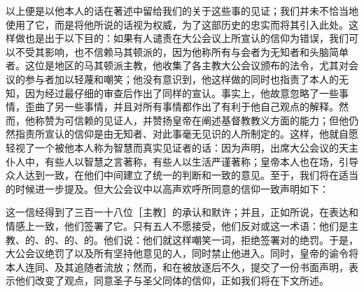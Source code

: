 以上便是以他本人的话在著述中留给我们的关于这些事的见证；我们并未不恰当地使用了它，而是将他所说的话视为权威，为了这部历史的忠实而将其引入此处。这样做也是出于以下目的：如果有人谴责在大公会议上所宣认的信仰为错误，我们可以不受其影响，也不信赖马其顿派的，因为他称所有与会者为无知者和头脑简单者。这位是地区的马其顿派主教，他收集了各主教大公会议颁布的法令，尤其对会议的参与者加以轻蔑和嘲笑；他没有意识到，他这样做的同时也指责了本人的无知，因为经过最仔细的审查后作出了同样的宣认。事实上，他故意忽略了一些事情，歪曲了另一些事情，并且对所有事情都作出了有利于他自己观点的解释。然而，他称赞为可信赖的见证人，并赞扬皇帝在阐述基督教教义方面的能力；但他仍然指责所宣认的信仰是由无知者、对此事毫无见识的人所制定的。这样，他就自愿轻视了一个被他本人称为智慧而真实见证者的话：因为声明，出席大公会议的天主仆人中，有些人以智慧之言著称，有些人以生活严谨著称；皇帝本人也在场，引导众人达到一致，在他们中间建立了统一的判断和一致的意见。至于，我们将在适当的时候进一步提及。但大公会议中以高声欢呼所同意的信仰一致声明如下：\par

\par

这一信经得到了三百一十八位［主教］的承认和默许；并且，正如所说，在表达和情感上一致，他们签署了它。只有五人不愿接受，他们反对或这一术语：他们是主教、的、的、的、的。他们说：他们就这样嘲笑一词，拒绝签署对的绝罚。于是，大公会议绝罚了以及所有坚持他意见的人，同时禁止他进入。同时，皇帝的谕令将本人连同、及其追随者流放；然而，和在被放逐后不久，提交了一份书面声明，表示他们改变了观点，同意圣子与圣父同体的信仰，正如我们将在下文所述。\par

